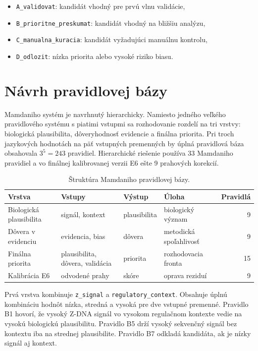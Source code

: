 \documentclass[12pt,a4paper]{article}
\begin{document}
\begin{itemize}
  \item \texttt{A\_validovat}: kandidát vhodný pre prvú vlnu validácie,
  \item \texttt{B\_prioritne\_preskumat}: kandidát vhodný na bližšiu analýzu,
  \item \texttt{C\_manualna\_kuracia}: kandidát vyžadujúci manuálnu kontrolu,
  \item \texttt{D\_odlozit}: nízka priorita alebo vysoké riziko biasu.
\end{itemize}

\section{Návrh pravidlovej bázy}

Mamdaniho systém je navrhnutý hierarchicky. Namiesto jedného veľkého pravidlového systému s piatimi vstupmi sa rozhodovanie rozdelí na tri vrstvy: biologická plausibilita, dôveryhodnosť evidencie a finálna priorita. Pri troch jazykových hodnotách na päť vstupných premenných by úplná pravidlová báza obsahovala $3^5 = 243$ pravidiel. Hierarchické riešenie používa 33 Mamdaniho pravidiel a vo finálnej kalibrovanej verzii E6 ešte 9 prahových korekcií.

\begin{table}[htbp]
\centering
\caption{Štruktúra Mamdaniho pravidlovej bázy.}
\begin{tabular}{>{\raggedright\arraybackslash}p{3.0cm}>{\raggedright\arraybackslash}p{3.0cm}>{\raggedright\arraybackslash}p{2.4cm}>{\raggedright\arraybackslash}p{3.2cm}r}
\toprule
Vrstva & Vstupy & Výstup & Úloha & Pravidlá \\
\midrule
Biologická plausibilita & signál, kontext & plausibilita & biologický význam & 9 \\
Dôvera v evidenciu & evidencia, bias & dôvera & metodická spoľahlivosť & 9 \\
Finálna priorita & plausibilita, dôvera, validácia & priorita & rozhodovacia fronta & 15 \\
Kalibrácia E6 & odvodené prahy & skóre & oprava reziduí & 9 \\
\bottomrule
\end{tabular}
\end{table}

Prvá vrstva kombinuje \texttt{z\_signal} a \texttt{regulatory\_context}. Obsahuje úplnú kombináciu hodnôt nízka, stredná a vysoká pre dve vstupné premenné. Pravidlo B1 hovorí, že vysoký Z-DNA signál vo vysokom regulačnom kontexte vedie na vysokú biologickú plausibilitu. Pravidlo B5 drží vysoký sekvenčný signál bez kontextu iba na strednej plausibilite. Pravidlo B7 odkladá kandidáta, ak je nízky signál aj kontext.
\end{document}
